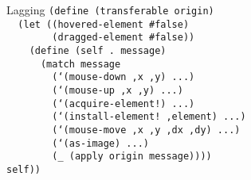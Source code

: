 

\begin{frame}{Lagging}
  \texttt{(define (transferable origin)\\
    \ \ (let ((hovered-element \#false)\\
    \ \ \ \ \ \ \ \ (dragged-element \#false))\\
    \ \ \ \ (define (self .\ message)\\
    \ \ \ \ \ \ (match message\\
    \ \ \ \ \ \ \ \ (`(mouse-down ,x ,y) ...)\\
    \ \ \ \ \ \ \ \ (`(mouse-up ,x ,y) ...)\\
    \ \ \ \ \ \ \ \ (`(acquire-element!) ...)\\
    \ \ \ \ \ \ \ \ (`(install-element!\ ,element) ...)\\
    \ \ \ \ \ \ \ \ (`(mouse-move ,x ,y ,dx ,dy) ...)\\
    \ \ \ \ \ \ \ \ (`(as-image) ...)\\
    \ \ \ \ \ \ \ \ (\_ (apply origin message))))\\
    self))
  }
\end{frame}


